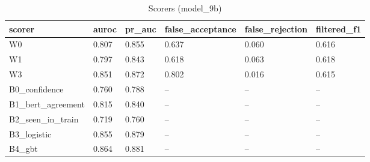 \begin{table}[t]
\centering
\small
\begin{tabular}{llllll}
\hline
scorer & auroc & pr\_auc & false\_acceptance & false\_rejection & filtered\_f1 \\
\hline
W0 & 0.807 & 0.855 & 0.637 & 0.060 & 0.616 \\
W1 & 0.797 & 0.843 & 0.618 & 0.063 & 0.618 \\
W3 & 0.851 & 0.872 & 0.802 & 0.016 & 0.615 \\
B0\_confidence & 0.760 & 0.788 & -- & -- & -- \\
B1\_bert\_agreement & 0.815 & 0.840 & -- & -- & -- \\
B2\_seen\_in\_train & 0.719 & 0.760 & -- & -- & -- \\
B3\_logistic & 0.855 & 0.879 & -- & -- & -- \\
B4\_gbt & 0.864 & 0.881 & -- & -- & -- \\
\hline
\end{tabular}
\caption{Scorers (model\_9b)}
\label{tab:scorers_model_9b}
\end{table}
